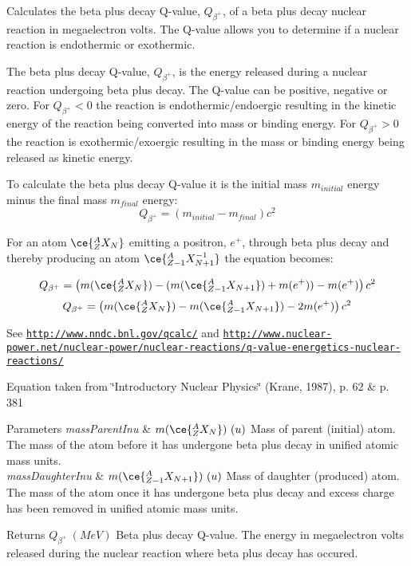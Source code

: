 Calculates the beta plus decay Q-\/value, $Q_{\beta^+}$, of a beta plus decay nuclear reaction in megaelectron volts. The Q-\/value allows you to determine if a nuclear reaction is endothermic or exothermic. 

The beta plus decay Q-\/value, $Q_{\beta^+}$, is the energy released during a nuclear reaction undergoing beta plus decay. The Q-\/value can be positive, negative or zero. For $Q_{\beta^+} < 0$ the reaction is endothermic/endoergic resulting in the kinetic energy of the reaction being converted into mass or binding energy. For $Q_{\beta^+} > 0$ the reaction is exothermic/exoergic resulting in the mass or binding energy being released as kinetic energy.

To calculate the beta plus decay Q-\/value it is the initial mass $m_{initial}$ energy minus the final mass $m_{final}$ energy\+: \[Q_{\beta^+} = \left ( m_{initial}-m_{final}\right ) c^2\]

For an atom $\ce{ ^{A}_{Z}X_{N} }$ emitting a positron, $e^+$, through beta plus decay and thereby producing an atom $\ce{ ^{A}_{Z{-1}}X^{-1}_{N{+1}} }$ the equation becomes\+:

\[Q_{\beta^+} = \left ( m(\ce{ ^{A}_{Z}X_{N} }) - (m(\ce{ ^{A}_{Z{-1}}X_{N{+1}} }) + m(e^+)) - m(e^+)\right ) c^2\] \[Q_{\beta^+} = \left ( m(\ce{ ^{A}_{Z}X_{N} }) - m(\ce{ ^{A}_{Z{-1}}X_{N{+1}} }) - 2m(e^+)\right ) c^2\]

See \href{http://www.nndc.bnl.gov/qcalc/}{\tt http\+://www.\+nndc.\+bnl.\+gov/qcalc/} and \href{http://www.nuclear-power.net/nuclear-power/nuclear-reactions/q-value-energetics-nuclear-reactions/}{\tt http\+://www.\+nuclear-\/power.\+net/nuclear-\/power/nuclear-\/reactions/q-\/value-\/energetics-\/nuclear-\/reactions/}

Equation taken from \char`\"{}\+Introductory Nuclear Physics\char`\"{} (Krane, 1987), p. 62 \& p. 381


\begin{DoxyParams}{Parameters}
{\em mass\+Parent\+Inu} & $m(\ce{ ^{A}_{Z}X_{N} })\ (u)$ Mass of parent (initial) atom. The mass of the atom before it has undergone beta plus decay in unified atomic mass units. \\
\hline
{\em mass\+Daughter\+Inu} & $m(\ce{ ^{A}_{Z{-1}}X_{N{+1}} })\ (u)$ Mass of daughter (produced) atom. The mass of the atom once it has undergone beta plus decay and excess charge has been removed in unified atomic mass units. \\
\hline
\end{DoxyParams}
\begin{DoxyReturn}{Returns}
$Q_{\beta^+}\ (MeV)$ Beta plus decay Q-\/value. The energy in megaelectron volts released during the nuclear reaction where beta plus decay has occured. 
\end{DoxyReturn}
\mbox{\label{group___e_g_x_phys-_q_value_gaefd0ecd4ae3166d18a4748ff540e6bfc}} 
